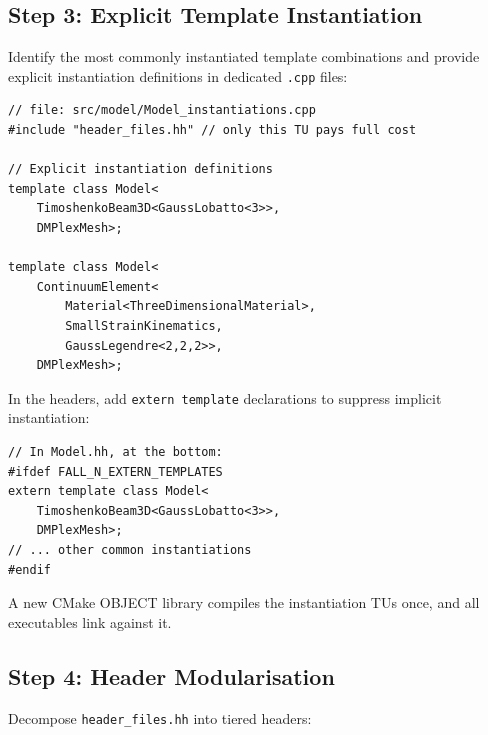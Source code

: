 \subsection{Step 3: Explicit Template Instantiation}
\label{sec:build-explicit-inst}

Identify the most commonly instantiated template combinations and
provide explicit instantiation definitions in dedicated
\texttt{.cpp} files:

\begin{lstlisting}[caption={Explicit instantiation example.}]
// file: src/model/Model_instantiations.cpp
#include "header_files.hh" // only this TU pays full cost

// Explicit instantiation definitions
template class Model<
    TimoshenkoBeam3D<GaussLobatto<3>>,
    DMPlexMesh>;

template class Model<
    ContinuumElement<
        Material<ThreeDimensionalMaterial>,
        SmallStrainKinematics,
        GaussLegendre<2,2,2>>,
    DMPlexMesh>;
\end{lstlisting}

In the headers, add \texttt{extern template} declarations to
suppress implicit instantiation:

\begin{lstlisting}[caption={\texttt{extern template} in header.}]
// In Model.hh, at the bottom:
#ifdef FALL_N_EXTERN_TEMPLATES
extern template class Model<
    TimoshenkoBeam3D<GaussLobatto<3>>,
    DMPlexMesh>;
// ... other common instantiations
#endif
\end{lstlisting}

A new CMake OBJECT library compiles the instantiation TUs once,
and all executables link against it.


\subsection{Step 4: Header Modularisation}
\label{sec:build-modularise}

Decompose \texttt{header\_files.hh} into tiered headers:

